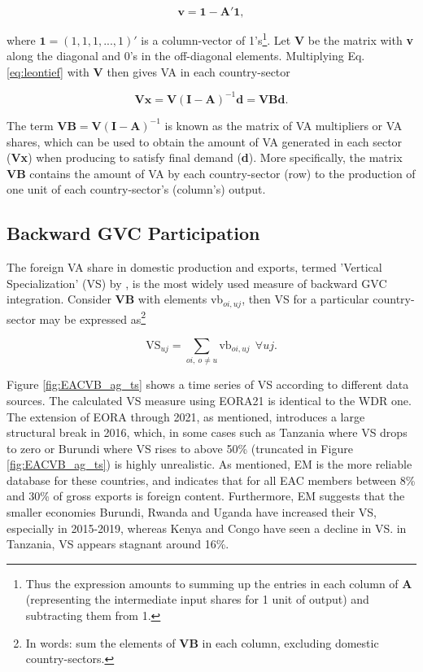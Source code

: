 \documentclass[a4paper]{article}
\begin{document}
\begin{equation}
\textbf{v} = \textbf{1} - \textbf{A}'\textbf{1},
\end{equation}

where $\textbf{1} = (1, 1, 1, ..., 1)'$ is a column-vector of 1's\footnote{Thus the expression amounts to summing up the entries in each column of \textbf{A} (representing the intermediate input shares for 1 unit of output) and subtracting them from 1.}. Let \textbf{V} be the matrix with \textbf{v} along the diagonal and 0's in the off-diagonal elements. Multiplying Eq. \ref{eq:leontief} with $\textbf{V}$ then gives VA in each country-sector

\begin{equation} \label{eq:VB}
\textbf{V}\textbf{x} = \textbf{V}(\textbf{I}-\textbf{A})^{-1} \textbf{d} = \textbf{VBd}.
\end{equation}

The term $\textbf{VB} = \textbf{V}(\textbf{I}-\textbf{A})^{-1}$ is known as the matrix of VA multipliers or VA shares, which can be used to obtain the amount of VA generated in each sector (\textbf{Vx}) when producing to satisfy final demand (\textbf{d}). More specifically, the matrix $\textbf{VB}$ contains the amount of VA by each country-sector (row) to the production of one unit of each country-sector's (column's) output. 


\subsection{Backward GVC Participation}

The foreign VA share in domestic production and exports, termed 'Vertical Specialization' (VS) by \citet{hummels2001nature}, is the most widely used measure of backward GVC integration. Consider \textbf{VB} with elements vb$_{oi,uj}$, then VS for a particular country-sector may be expressed as\footnote{In words: sum the elements of \textbf{VB} in each column, excluding domestic country-sectors.}

\begin{equation} \label{eq:VS}
\text{VS}_{uj} = \sum_{oi,\ o \neq  u} \text{vb}_{oi, uj}\ \ \forall uj.
\end{equation}

Figure \ref{fig:EACVB_ag_ts} shows a time series of VS according to different data sources. The calculated VS measure using EORA21 is identical to the WDR one. The extension of EORA through 2021, as mentioned, introduces a large structural break in 2016, which, in some cases such as Tanzania where VS drops to zero or Burundi where VS rises to above 50\% (truncated in Figure \ref{fig:EACVB_ag_ts}) is highly unrealistic. As mentioned, EM is the more reliable database for these countries, and indicates that for all EAC members between 8\% and 30\% of gross exports is foreign content. Furthermore, EM suggests that the smaller economies Burundi, Rwanda and Uganda have increased their VS, especially in 2015-2019, whereas Kenya and Congo have seen a decline in VS. in Tanzania, VS appears stagnant around 16\%. 
\end{document}
